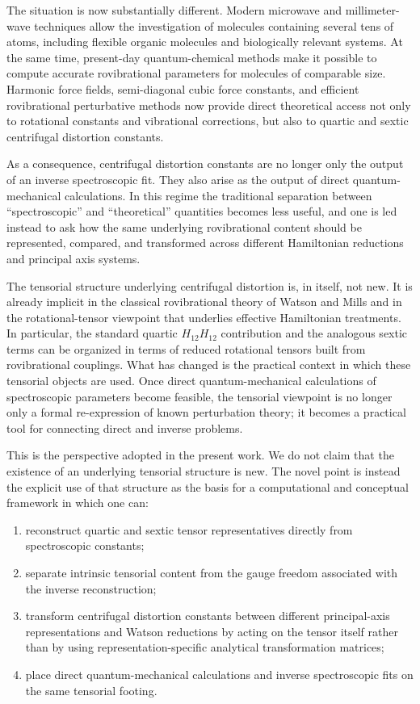 The situation is now substantially different.  Modern microwave and
millimeter-wave techniques allow the investigation of molecules
containing several tens of atoms, including flexible organic molecules
and biologically relevant systems.  At the same time, present-day
quantum-chemical methods make it possible to compute accurate
rovibrational parameters for molecules of comparable size.  Harmonic
force fields, semi-diagonal cubic force constants, and efficient
rovibrational perturbative methods now provide direct theoretical
access not only to rotational constants and vibrational corrections,
but also to quartic and sextic centrifugal distortion
constants.\cite{Mills1972,Nielsen1951}

As a consequence, centrifugal distortion constants are no longer only
the output of an inverse spectroscopic fit.  They also arise as the
output of direct quantum-mechanical calculations.  In this regime the
traditional separation between ``spectroscopic'' and ``theoretical''
quantities becomes less useful, and one is led instead to ask how the
same underlying rovibrational content should be represented, compared,
and transformed across different Hamiltonian reductions and principal
axis systems.

The tensorial structure underlying centrifugal distortion is, in
itself, not new.  It is already implicit in the classical rovibrational
theory of Watson and Mills and in the rotational-tensor viewpoint that
underlies effective Hamiltonian treatments.\cite{Mills1972,Watson1968,Watson1977,Kirschner1983}
In particular, the
standard quartic $H_{12}H_{12}$ contribution and the analogous sextic
terms can be organized in terms of reduced rotational tensors built
from rovibrational couplings.  What has changed is the practical
context in which these tensorial objects are used.  Once direct
quantum-mechanical calculations of spectroscopic parameters become
feasible, the tensorial viewpoint is no longer only a formal
re-expression of known perturbation theory; it becomes a practical tool
for connecting direct and inverse problems.

This is the perspective adopted in the present work.  We do not claim
that the existence of an underlying tensorial structure is new.  The
novel point is instead the explicit use of that structure as the basis
for a computational and conceptual framework in which one can:
\begin{enumerate}
\item reconstruct quartic and sextic tensor representatives directly
from spectroscopic constants;
\item separate intrinsic tensorial content from the gauge freedom
associated with the inverse reconstruction;
\item transform centrifugal distortion constants between different
principal-axis representations and Watson reductions by acting on the
tensor itself rather than by using representation-specific analytical
transformation matrices;
\item place direct quantum-mechanical calculations and inverse
spectroscopic fits on the same tensorial footing.
\end{enumerate}

